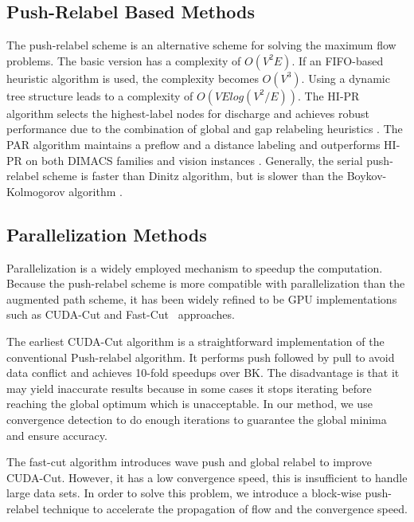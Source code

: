 \subsection{Push-Relabel Based Methods}

The push-relabel scheme is an alternative scheme for solving the maximum flow problems.
The basic version has a complexity of $O(V^2 E)$.
If an FIFO-based heuristic algorithm is used, the complexity becomes $O(V^3)$.
Using a dynamic tree structure leads to a complexity of $O(V E log(V^2 / E))$.
The HI-PR algorithm selects the highest-label nodes for discharge and achieves robust performance due to the combination of global and gap relabeling heuristics \cite{88GT, 97CG}.
The PAR algorithm maintains a preflow and a distance labeling and outperforms HI-PR on both DIMACS families and vision instances \cite{08G}.
Generally, the serial push-relabel scheme is faster than Dinitz algorithm, but is slower than the Boykov-Kolmogorov algorithm \cite{04BK, 12VB}.

\subsection{Parallelization Methods}

Parallelization is a widely employed mechanism to speedup the computation.
Because the push-relabel scheme is more compatible with parallelization than the augmented path scheme, it has been widely refined to be GPU implementations such as CUDA-Cut \cite{08VN} and Fast-Cut~\cite{09S, 11W} approaches.

The earliest CUDA-Cut algorithm \cite{08VN} is a straightforward implementation of the conventional Push-relabel algorithm.
It performs push followed by pull to avoid data conflict and achieves 10-fold speedups over BK.
The disadvantage is that it may yield inaccurate results because in some cases it stops iterating before reaching the global optimum which is unacceptable.
In our method, we use convergence detection to do enough iterations to guarantee the global minima and ensure accuracy.

The fast-cut algorithm \cite{11W} introduces wave push and global relabel to improve CUDA-Cut.
However, it has a low convergence speed, this is insufficient to handle large data sets.
In order to solve this problem, we introduce a block-wise push-relabel technique to accelerate the propagation of flow and the convergence speed.
